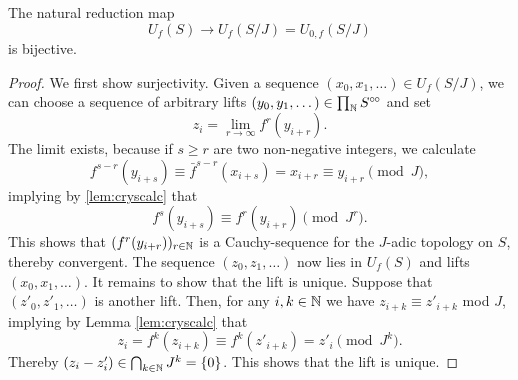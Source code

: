 \documentclass[../main.tex]{subfiles}
\begin{document}
\begin{lem}
  The natural reduction map 
  \begin{equation*}
    U_f(S) \to U_{f}(S/J) = U_{0,f}(S/J)
  \end{equation*}
  is bijective.
\begin{proof}
  We first show surjectivity. Given a sequence $(x_0, x_1, \dots) \in U_{f}(S/J)$, 
  we can choose a sequence of arbitrary lifts $(y_0, y_1, \dots ) \in \prod_{\mathbb{N}}
  S^{\circ \hspace{-0.5pt} \circ}$ and set 
  \begin{equation*}
    z_i = \lim_{r \to \infty} f^r(y_{i+r}).
  \end{equation*}
  The limit exists, because if $s\geq r$ are two non-negative integers, we calculate
  \begin{equation*}
    f^{s-r}(y_{i+s}) \equiv \bar f^{s-r}(x_{i+s}) = x_{i+r} \equiv y_{i+r}
    \pmod J,
  \end{equation*}
  implying by \ref{lem:cryscalc} that 
  \begin{equation*}
    f^{s}(y_{i+s}) \equiv f^r(y_{i+r}) \pmod{J^r}.
  \end{equation*}
  This shows that $(f^{r}(y_{i+r}))_{r \in \mathbb{N}}$ is a Cauchy-sequence for the 
  $J$-adic topology on $S$, thereby convergent. The sequence 
  $(z_0, z_1, \dots)$ now lies in $U_f(S)$ and lifts $(x_0, x_1, \dots)$. 
  It remains to show that the lift is unique. Suppose that 
  $(z'_0, z'_1, \dots)$ is another lift. Then, for any $i,k \in\mathbb{N}$
  we have $z_{i+k} \equiv z'_{i+k}$ mod $J$, implying by 
  Lemma \ref{lem:cryscalc} that 
  \begin{equation*}
    z_i = f^k(z_{i+k}) \equiv f^k(z'_{i+k}) = z'_i \pmod {J^k}.
  \end{equation*}
  Thereby $(z_i - z'_i) \in \bigcap_{k \in \mathbb{N}} J^k = \{0\}$. This shows that
  the lift is unique.
\end{proof}
\end{lem}
\end{document}
